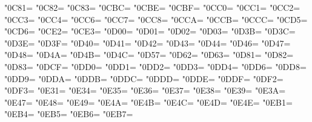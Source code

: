 \XeTeXcharclass"0C81=\KclassCM
\XeTeXcharclass"0C82=\KclassCM
\XeTeXcharclass"0C83=\KclassCM
\XeTeXcharclass"0CBC=\KclassCM
\XeTeXcharclass"0CBE=\KclassCM
\XeTeXcharclass"0CBF=\KclassCM
\XeTeXcharclass"0CC0=\KclassCM
\XeTeXcharclass"0CC1=\KclassCM
\XeTeXcharclass"0CC2=\KclassCM
\XeTeXcharclass"0CC3=\KclassCM
\XeTeXcharclass"0CC4=\KclassCM
\XeTeXcharclass"0CC6=\KclassCM
\XeTeXcharclass"0CC7=\KclassCM
\XeTeXcharclass"0CC8=\KclassCM
\XeTeXcharclass"0CCA=\KclassCM
\XeTeXcharclass"0CCB=\KclassCM
\XeTeXcharclass"0CCC=\KclassCM
\XeTeXcharclass"0CD5=\KclassCM
\XeTeXcharclass"0CD6=\KclassCM
\XeTeXcharclass"0CE2=\KclassCM
\XeTeXcharclass"0CE3=\KclassCM
\XeTeXcharclass"0D00=\KclassCM
\XeTeXcharclass"0D01=\KclassCM
\XeTeXcharclass"0D02=\KclassCM
\XeTeXcharclass"0D03=\KclassCM
\XeTeXcharclass"0D3B=\KclassCM
\XeTeXcharclass"0D3C=\KclassCM
\XeTeXcharclass"0D3E=\KclassCM
\XeTeXcharclass"0D3F=\KclassCM
\XeTeXcharclass"0D40=\KclassCM
\XeTeXcharclass"0D41=\KclassCM
\XeTeXcharclass"0D42=\KclassCM
\XeTeXcharclass"0D43=\KclassCM
\XeTeXcharclass"0D44=\KclassCM
\XeTeXcharclass"0D46=\KclassCM
\XeTeXcharclass"0D47=\KclassCM
\XeTeXcharclass"0D48=\KclassCM
\XeTeXcharclass"0D4A=\KclassCM
\XeTeXcharclass"0D4B=\KclassCM
\XeTeXcharclass"0D4C=\KclassCM
\XeTeXcharclass"0D57=\KclassCM
\XeTeXcharclass"0D62=\KclassCM
\XeTeXcharclass"0D63=\KclassCM
\XeTeXcharclass"0D81=\KclassCM
\XeTeXcharclass"0D82=\KclassCM
\XeTeXcharclass"0D83=\KclassCM
\XeTeXcharclass"0DCF=\KclassCM
\XeTeXcharclass"0DD0=\KclassCM
\XeTeXcharclass"0DD1=\KclassCM
\XeTeXcharclass"0DD2=\KclassCM
\XeTeXcharclass"0DD3=\KclassCM
\XeTeXcharclass"0DD4=\KclassCM
\XeTeXcharclass"0DD6=\KclassCM
\XeTeXcharclass"0DD8=\KclassCM
\XeTeXcharclass"0DD9=\KclassCM
\XeTeXcharclass"0DDA=\KclassCM
\XeTeXcharclass"0DDB=\KclassCM
\XeTeXcharclass"0DDC=\KclassCM
\XeTeXcharclass"0DDD=\KclassCM
\XeTeXcharclass"0DDE=\KclassCM
\XeTeXcharclass"0DDF=\KclassCM
\XeTeXcharclass"0DF2=\KclassCM
\XeTeXcharclass"0DF3=\KclassCM
\XeTeXcharclass"0E31=\KclassCM
\XeTeXcharclass"0E34=\KclassCM
\XeTeXcharclass"0E35=\KclassCM
\XeTeXcharclass"0E36=\KclassCM
\XeTeXcharclass"0E37=\KclassCM
\XeTeXcharclass"0E38=\KclassCM
\XeTeXcharclass"0E39=\KclassCM
\XeTeXcharclass"0E3A=\KclassCM
\XeTeXcharclass"0E47=\KclassCM
\XeTeXcharclass"0E48=\KclassCM
\XeTeXcharclass"0E49=\KclassCM
\XeTeXcharclass"0E4A=\KclassCM
\XeTeXcharclass"0E4B=\KclassCM
\XeTeXcharclass"0E4C=\KclassCM
\XeTeXcharclass"0E4D=\KclassCM
\XeTeXcharclass"0E4E=\KclassCM
\XeTeXcharclass"0EB1=\KclassCM
\XeTeXcharclass"0EB4=\KclassCM
\XeTeXcharclass"0EB5=\KclassCM
\XeTeXcharclass"0EB6=\KclassCM
\XeTeXcharclass"0EB7=\KclassCM
